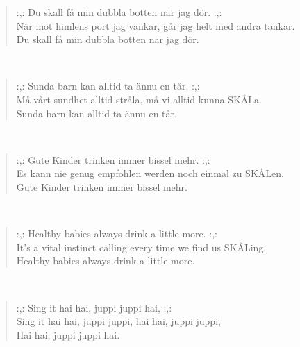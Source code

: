 \noindent\begin{minipage}{\linewidth}
\begin{verse}
	\hspace{0pt-\widthof{:,: }}:,: Du skall få min dubbla botten när jag dör. :,:\\
	När mot himlens port jag vankar, går jag helt med andra tankar.\\
	Du skall få min dubbla botten när jag dör.\\
\end{verse}
\end{minipage}\\[10pt]
\noindent\begin{minipage}{\linewidth}
\begin{verse}
	\hspace{0pt-\widthof{:,: }}:,: Sunda barn kan alltid ta ännu en tår. :,:\\
	Må vårt sundhet alltid stråla, må vi alltid kunna SKÅLa.\\
	Sunda barn kan alltid ta ännu en tår.\\
\end{verse}
\end{minipage}\\[10pt]
\noindent\begin{minipage}{\linewidth}
\begin{verse}
	\hspace{0pt-\widthof{:,: }}:,: Gute Kinder trinken immer bissel mehr. :,:\\
	Es kann nie genug empfohlen werden noch einmal zu SKÅLen.\\
	Gute Kinder trinken immer bissel mehr.\\
\end{verse}
\end{minipage}\\[10pt]
\noindent\begin{minipage}{\linewidth}
\begin{verse}
	\hspace{0pt-\widthof{:,: }}:,: Healthy babies always drink a little more. :,:\\
	It's a vital instinct calling every time we find us SKÅLing.\\
	Healthy babies always drink a little more.\\
\end{verse}
\end{minipage}\\[10pt]
\noindent\begin{minipage}{\linewidth}
\begin{verse}
	\hspace{0pt-\widthof{:,: }}:,: Sing it hai hai, juppi juppi hai, :,:\\
	Sing it hai hai, juppi juppi, hai hai, juppi juppi,\\
	Hai hai, juppi juppi hai.\\
\end{verse}
\end{minipage}\\[10pt]
